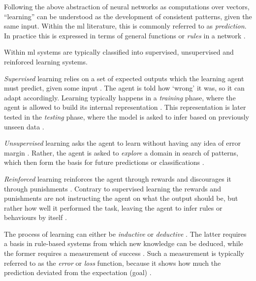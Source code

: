 \documentclass[report.tex]{subfiles}
\begin{document}
Following the above abstraction of neural networks as computations over vectors,
``learning''  can be understood as the development of consistent
patterns, given the same input.
Within the \gls{ml} literature, this is commonly referred to as 
\textit{prediction}. 
In practice this is expressed in terms of general functions or
\textit{rules}  in a network \cite[p. 704.]{Russel2007}.

Within \gls{ml} systems are typically classified into
supervised, 
unsupervised  and reinforced learning systems.

\textit{Supervised} learning relies on a set of expected outputs which 
the learning \gls{agent} must predict, given some input \cite{Russel2007}.
The \gls{agent} is told how `wrong' it was, so it can adapt accordingly.
Learning typically happens in a \textit{training} 
phase, where the \gls{agent} is allowed to build its internal representation 
\cite{Russel2007}.
This representation is later tested in the \textit{testing} phase, 
where the model is asked to infer based on previously unseen data \cite{Russel2007}.

\textit{Unsupervised} learning asks the \gls{agent} to learn without
having any idea of error margin \cite{Russel2007}.
Rather, the \gls{agent} is asked to \textit{explore} a domain in search of
patterns, which then form the basis for future predictions or classifications
\cite{Russel2007}.

\textit{Reinforced} learning reinforces the \gls{agent} through
rewards and discourages it through punishments \cite{Russel2007}.
Contrary to supervised learning the rewards and punishments are not
instructing the agent on what the output should be, but rather how well
it performed the task, leaving the \gls{agent} to infer rules or
behaviours by itself \cite[p. 873]{Russel2007}.

The process of learning can either be \textit{inductive}
or \textit{deductive}  \cite[p. 704]{Russel2007}.
The latter requires a basis in rule-based systems from which new knowledge can
be deduced, while the former requires a measurement of success \cite[p. 705]{Russel2007}.
Such a measurement is typically referred to as the \textit{error} or \textit{loss}
function,
because it shows how much the prediction deviated from the expectation (goal)
\cite{Russel2007}.
\end{document}
